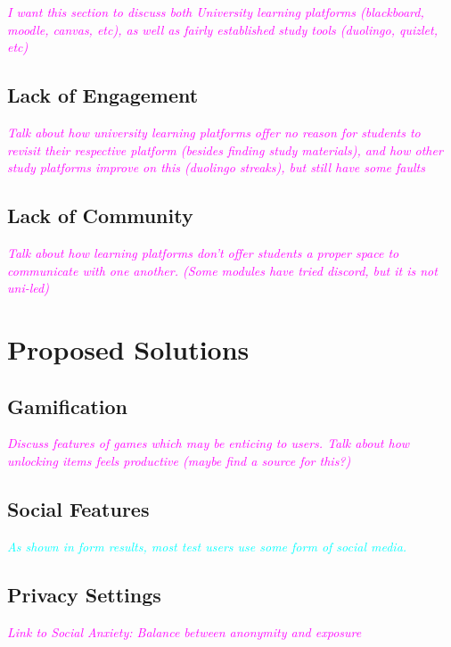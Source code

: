 \documentclass{report}
\begin{document}
\textcolor{magenta}{\textit{I want this section to discuss both University learning platforms (blackboard, moodle, canvas, etc), as well as fairly established study tools (duolingo, quizlet, etc)}}

\subsection{Lack of Engagement}

\textcolor{magenta}{\textit{Talk about how university learning platforms offer no reason for students to revisit their respective platform (besides finding study materials), and how other study platforms improve on this (duolingo streaks), but still have some faults}}

\subsection{Lack of Community}

\textcolor{magenta}{\textit{Talk about how learning platforms don't offer students a proper space to communicate with one another. (Some modules have tried discord, but it is not uni-led)}}

\section{Proposed Solutions}

\subsection{Gamification}

\textcolor{magenta}{\textit{Discuss features of games which may be enticing to users. Talk about how unlocking items feels productive (maybe find a source for this?)}}

\subsection{Social Features}

\textcolor{cyan}{\textit{As shown in form results, most test users use some form of social media.}}

\subsection{Privacy Settings}

\textcolor{magenta}{\textit{Link to Social Anxiety: Balance between anonymity and exposure}}
\end{document}
